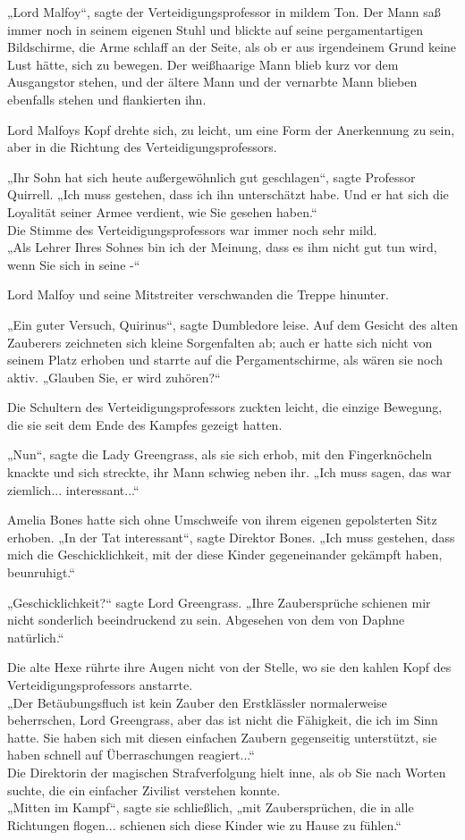 {„Lord Malfoy“, sagte der Verteidigungsprofessor in mildem Ton. Der Mann saß immer noch in seinem eigenen Stuhl und blickte auf seine pergamentartigen Bildschirme, die Arme schlaff an der Seite, als ob er aus irgendeinem Grund keine Lust hätte, sich zu bewegen. Der weißhaarige Mann blieb kurz vor dem Ausgangstor stehen, und der ältere Mann und der vernarbte Mann blieben ebenfalls stehen und flankierten ihn.

Lord Malfoys Kopf drehte sich, zu leicht, um eine Form der Anerkennung zu sein, aber in die Richtung des Verteidigungsprofessors.

„Ihr Sohn hat sich heute außergewöhnlich gut geschlagen“, sagte Professor Quirrell. „Ich muss gestehen, dass ich ihn unterschätzt habe. Und er hat sich die Loyalität seiner Armee verdient, wie Sie gesehen haben.“\\ Die Stimme des Verteidigungsprofessors war immer noch sehr mild.\\ „Als Lehrer Ihres Sohnes bin ich der Meinung, dass es ihm nicht gut tun wird, wenn Sie sich in seine -“

Lord Malfoy und seine Mitstreiter verschwanden die Treppe hinunter.

„Ein guter Versuch, Quirinus“, sagte Dumbledore leise. Auf dem Gesicht des alten Zauberers zeichneten sich kleine Sorgenfalten ab; auch er hatte sich nicht von seinem Platz erhoben und starrte auf die Pergamentschirme, als wären sie noch aktiv. „Glauben Sie, er wird zuhören?“

Die Schultern des Verteidigungsprofessors zuckten leicht, die einzige Bewegung, die sie seit dem Ende des Kampfes gezeigt hatten.

„Nun“, sagte die Lady Greengrass, als sie sich erhob, mit den Fingerknöcheln knackte und sich streckte, ihr Mann schwieg neben ihr. „Ich muss sagen, das war ziemlich... interessant...“

Amelia Bones hatte sich ohne Umschweife von ihrem eigenen gepolsterten Sitz erhoben. „In der Tat interessant“, sagte Direktor Bones. „Ich muss gestehen, dass mich die Geschicklichkeit, mit der diese Kinder gegeneinander gekämpft haben, beunruhigt.“

„Geschicklichkeit?“ sagte Lord Greengrass. „Ihre Zaubersprüche schienen mir nicht sonderlich beeindruckend zu sein. Abgesehen von dem von Daphne natürlich.“

Die alte Hexe rührte ihre Augen nicht von der Stelle, wo sie den kahlen Kopf des Verteidigungsprofessors anstarrte.\\ „Der Betäubungsfluch ist kein Zauber den Erstklässler normalerweise beherrschen, Lord Greengrass, aber das ist nicht die Fähigkeit, die ich im Sinn hatte. Sie haben sich mit diesen einfachen Zaubern gegenseitig unterstützt, sie haben schnell auf Überraschungen reagiert...“\\ Die Direktorin der magischen Strafverfolgung hielt inne, als ob Sie nach Worten suchte, die ein einfacher Zivilist verstehen konnte.\\ „Mitten im Kampf“, sagte sie schließlich, „mit Zaubersprüchen, die in alle Richtungen flogen... schienen sich diese Kinder wie zu Hause zu fühlen.“

}
